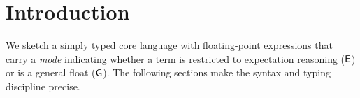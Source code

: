 \section{Introduction}
We sketch a simply typed core language with floating-point expressions that carry a \emph{mode} indicating whether a term is restricted to expectation reasoning ($\mathsf{E}$) or is a general float ($\mathsf{G}$). The following sections make the syntax and typing discipline precise.


